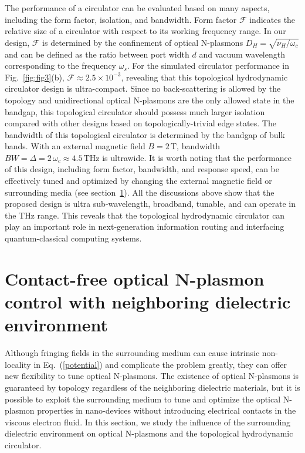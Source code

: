 \documentclass[%
reprint,
amsmath,amssymb,
aps,superscriptaddress
]{revtex4-2}
\begin{document}
The performance of a circulator can be evaluated based on many aspects, including the form factor, isolation, and bandwidth. Form factor $\mathcal{F}$ indicates the relative size of a circulator with respect to its working frequency range. In our design, $\mathcal{F}$ is determined by the confinement of optical N-plasmons $D_H=\sqrt{\nu_H/\omega_c}$ and can be defined as the ratio between port width $d$ and vacuum wavelength corresponding to the frequency $\omega_s$. For the simulated circulator performance in Fig.~\ref{fig:fig3}(b), $\mathcal{F} \approx 2.5\times 10^{-3}$, revealing that this topological hydrodynamic circulator design is ultra-compact. Since no back-scattering is allowed by the topology and unidirectional optical N-plasmons are the only allowed state in the bandgap, this topological circulator should possess much larger isolation compared with other designs based on topologically-trivial edge states. The bandwidth of this topological circulator is determined by the bandgap of bulk bands. With an external magnetic field $B=2\, \mathrm{T}$, bandwidth $BW=\Delta=2\, \omega_c \approx 4.5 \,  \mathrm{THz}$ is ultrawide. It is worth noting that the performance of this design, including form factor, bandwidth, and response speed, can be effectively tuned and optimized by changing the external magnetic field or surrounding media (see section~\ref{section4}). All the discussions above show that the proposed design is ultra sub-wavelength, broadband, tunable, and can operate in the THz range. This reveals that the topological hydrodynamic circulator can play an important role in next-generation information routing and interfacing quantum-classical computing systems.

\section{Contact-free optical N-plasmon control with neighboring dielectric environment}\label{section4}

Although fringing fields in the surrounding medium can cause intrinsic non-locality in Eq.~(\ref{potential}) and complicate the problem greatly, they can offer new flexibility to tune optical N-plasmons. The existence of optical N-plasmons is guaranteed by topology regardless of the neighboring dielectric materials, but it is possible to exploit the surrounding medium to tune and optimize the optical N-plasmon properties in nano-devices without introducing electrical contacts in the viscous electron fluid. In this section, we study the influence of the surrounding dielectric environment on optical N-plasmons and the topological hydrodynamic circulator. 
\end{document}
